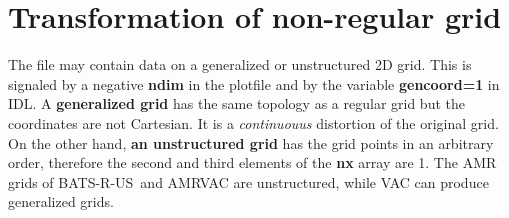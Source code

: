\documentclass{article}
\newcommand{\BATSRUS}{BATS-R-US}
\begin{document}
\section{Transformation of non-regular grid \label{s-transform}}

The file may contain data on a generalized or unstructured 2D grid.
This is signaled by a negative {\bf ndim} in the plotfile 
and by the variable {\bf gencoord=1} in IDL.
A {\bf generalized grid} has the same topology as a regular grid
but the coordinates are not Cartesian. It is a {\it continuouus}
distortion of the original grid. On the other hand, 
{\bf an unstructured grid} has the grid points in an arbitrary
order, therefore the second and third elements of the 
{\bf nx} array are 1. The AMR grids of \BATSRUS\ and AMRVAC are
unstructured, while VAC can produce generalized grids.
\end{document}
